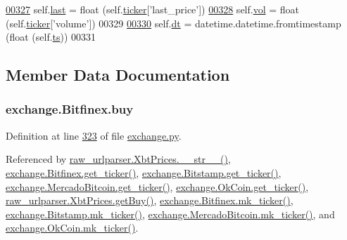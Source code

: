 \begin{DoxyCode}
\hypertarget{classexchange_1_1_bitfinex.tex_l00327}{}\hyperlink{classexchange_1_1_bitfinex_a56e491a27f4b3215b66e13da7796c078}{00327}         self.\hyperlink{classexchange_1_1_bitfinex_a56e491a27f4b3215b66e13da7796c078}{last} = float (self.\hyperlink{classexchange_1_1_exchange_a7cf9e52f993627955a2e242c388daaeb}{ticker}[\textcolor{stringliteral}{'last\_price'}])
\hypertarget{classexchange_1_1_bitfinex.tex_l00328}{}\hyperlink{classexchange_1_1_bitfinex_a278da3a9eab93e256041c988f9bbd54c}{00328}         self.\hyperlink{classexchange_1_1_bitfinex_a278da3a9eab93e256041c988f9bbd54c}{vol}  = float (self.\hyperlink{classexchange_1_1_exchange_a7cf9e52f993627955a2e242c388daaeb}{ticker}[\textcolor{stringliteral}{'volume'}])
00329     
\hypertarget{classexchange_1_1_bitfinex.tex_l00330}{}\hyperlink{classexchange_1_1_bitfinex_adc9e5a19056dcc22e8028e749b233795}{00330}         self.\hyperlink{classexchange_1_1_bitfinex_adc9e5a19056dcc22e8028e749b233795}{dt} = datetime.datetime.fromtimestamp (float (self.\hyperlink{classexchange_1_1_bitfinex_abf872e8ea738acd33d34a00d9d9e92c4}{ts}))
00331     
\end{DoxyCode}


\subsection{Member Data Documentation}
\subsubsection[{\texorpdfstring{buy}{buy}}]{\setlength{\rightskip}{0pt plus 5cm}exchange.\+Bitfinex.\+buy}\hypertarget{classexchange_1_1_bitfinex_aed7ff0d2287aaf4d61985d6f11c23c98}{}\label{classexchange_1_1_bitfinex_aed7ff0d2287aaf4d61985d6f11c23c98}


Definition at line \hyperlink{exchange_8py_source_l00323}{323} of file \hyperlink{exchange_8py_source}{exchange.\+py}.



Referenced by \hyperlink{raw__urlparser_8py_source_l00074}{raw\+\_\+urlparser.\+Xbt\+Prices.\+\_\+\+\_\+str\+\_\+\+\_\+()}, \hyperlink{exchange_8py_source_l00332}{exchange.\+Bitfinex.\+get\+\_\+ticker()}, \hyperlink{exchange_8py_source_l00401}{exchange.\+Bitstamp.\+get\+\_\+ticker()}, \hyperlink{exchange_8py_source_l00535}{exchange.\+Mercado\+Bitcoin.\+get\+\_\+ticker()}, \hyperlink{exchange_8py_source_l00600}{exchange.\+Ok\+Coin.\+get\+\_\+ticker()}, \hyperlink{raw__urlparser_8py_source_l00062}{raw\+\_\+urlparser.\+Xbt\+Prices.\+get\+Buy()}, \hyperlink{exchange_8py_source_l00346}{exchange.\+Bitfinex.\+mk\+\_\+ticker()}, \hyperlink{exchange_8py_source_l00415}{exchange.\+Bitstamp.\+mk\+\_\+ticker()}, \hyperlink{exchange_8py_source_l00549}{exchange.\+Mercado\+Bitcoin.\+mk\+\_\+ticker()}, and \hyperlink{exchange_8py_source_l00614}{exchange.\+Ok\+Coin.\+mk\+\_\+ticker()}.


